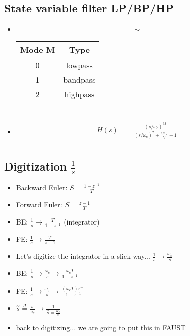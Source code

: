 \subsection*{State variable filter LP/BP/HP}
\begin{itemize}
\item{
\begin{align*}
\sim
\end{align*}
}

\begin{tabular}{c | c}
Mode M & Type \\
\hline
0 & lowpass \\
1 & bandpass \\
2 & highpass \\
\end{tabular}

\begin{align*}
\end{align*}

\item{ 
\begin{align*}
H(s) &= \frac{(s / \omega_c)^M}{(s/ \omega_c)^2 + \frac{s/\omega_c}{Q} + 1}  \\
\end{align*}
}

\end{itemize}
\subsection*{Digitization $\frac{1}{s}$}

\begin{itemize}
\item{Backward Euler: $S = \frac{1 - z^{-1}}{T}$}
\item{Forward Euler: $S = \frac{z - 1}{T}$}
\item{BE: $\frac{1}{s} \rightarrow \frac{T}{1 - z^{-1}}$ (integrator)}
\item{FE: $\frac{1}{s} \rightarrow \frac{T}{z - 1}$}
\item{Let's digitize the integrator in a slick way... $\frac{1}{s} \rightarrow \frac{\omega_c}{s}$ }
\item{BE: $\frac{1}{s} \rightarrow \frac{\omega_c}{s} \rightarrow \frac{\omega_c T}{1 - z^{-1}}$}
\item{FE: $\frac{1}{s} \rightarrow \frac{\omega_c}{s} \rightarrow \frac{(\omega_c T)z^{-1}}{1 - z^{-1}}$} 
\item{$\stackrel{\sim}{s} \stackrel{\Delta}{=} \frac{s}{\omega_c} \rightarrow \frac{1}{\stackrel{\sim}{s} = \frac{\omega_c}{s}}$}
\item{back to digitizing... we are going to put this in FAUST
}
\end{itemize}


